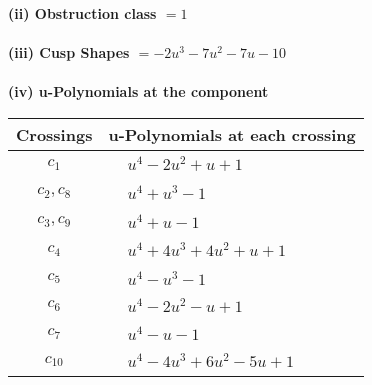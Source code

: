 \documentclass[1p]{elsarticle_modified}
\theoremstyle{definition}
\begin{document}
\flushleft \textbf{(ii) Obstruction class $= 1$}\\~\\
\flushleft \textbf{(iii) Cusp Shapes $= -2 u^3-7 u^2-7 u-10$}\\~\\
\newpage\renewcommand{\arraystretch}{1}
\flushleft \textbf{(iv) u-Polynomials at the component}\newline \\
\begin{tabular}{m{50pt}|m{274pt}}
Crossings & \hspace{64pt}u-Polynomials at each crossing \\
\hline $$\begin{aligned}c_{1}\end{aligned}$$&$\begin{aligned}
&u^4-2 u^2+u+1
\end{aligned}$\\
\hline $$\begin{aligned}c_{2},c_{8}\end{aligned}$$&$\begin{aligned}
&u^4+u^3-1
\end{aligned}$\\
\hline $$\begin{aligned}c_{3},c_{9}\end{aligned}$$&$\begin{aligned}
&u^4+u-1
\end{aligned}$\\
\hline $$\begin{aligned}c_{4}\end{aligned}$$&$\begin{aligned}
&u^4+4 u^3+4 u^2+u+1
\end{aligned}$\\
\hline $$\begin{aligned}c_{5}\end{aligned}$$&$\begin{aligned}
&u^4- u^3-1
\end{aligned}$\\
\hline $$\begin{aligned}c_{6}\end{aligned}$$&$\begin{aligned}
&u^4-2 u^2- u+1
\end{aligned}$\\
\hline $$\begin{aligned}c_{7}\end{aligned}$$&$\begin{aligned}
&u^4- u-1
\end{aligned}$\\
\hline $$\begin{aligned}c_{10}\end{aligned}$$&$\begin{aligned}
&u^4-4 u^3+6 u^2-5 u+1
\end{aligned}$\\
\hline
\end{tabular}\\~\\
\end{document}
